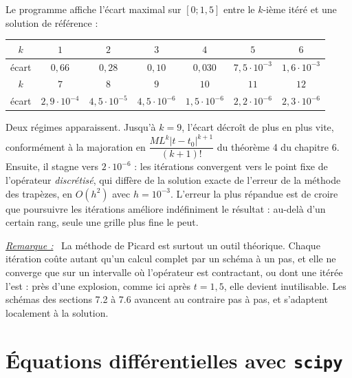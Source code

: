 \documentclass[a4paper,twoside]{report}
\newenvironment{remarque}%
 {\par\needspace{6\baselineskip}\vspace{1mm}\begin{list}{}{\leftmargin=1cm \rightmargin=0.5cm}\item[]%
  \textit{\underline{Remarque :}}~}%
 {\end{list}\vspace{1mm}}
\begin{document}
\noindent Le programme affiche l'écart maximal sur $[0 ; 1{,}5]$ entre le $k$-ième itéré et une solution de référence :

\begin{center}
\renewcommand{\arraystretch}{1.3}
\begin{tabular}{|c|c|c|c|c|c|c|}
\hline
\rowcolor{couleurD!35} $k$ & $1$ & $2$ & $3$ & $4$ & $5$ & $6$ \\ \hline
écart & $0{,}66$ & $0{,}28$ & $0{,}10$ & $0{,}030$ & $7{,}5\cdot 10^{-3}$ & $1{,}6\cdot 10^{-3}$ \\ \hline
\rowcolor{couleurD!35} $k$ & $7$ & $8$ & $9$ & $10$ & $11$ & $12$ \\ \hline
écart & $2{,}9\cdot 10^{-4}$ & $4{,}5\cdot 10^{-5}$ & $4{,}5\cdot 10^{-6}$ & $1{,}5\cdot 10^{-6}$ & $2{,}2\cdot 10^{-6}$ & $2{,}3\cdot 10^{-6}$ \\ \hline
\end{tabular}
\end{center}

\noindent Deux régimes apparaissent. Jusqu'à $k = 9$, l'écart décroît de plus en plus vite, conformément à la majoration en $\dfrac{M L^{k}|t - t_{0}|^{k + 1}}{(k + 1)!}$ du théorème 4 du chapitre 6. Ensuite, il stagne vers $2 \cdot 10^{-6}$ : les itérations convergent vers le point fixe de l'opérateur \emph{discrétisé}, qui diffère de la solution exacte de l'erreur de la méthode des trapèzes, en $O(h^{2})$ avec $h = 10^{-3}$. L'erreur la plus répandue est de croire que poursuivre les itérations améliore indéfiniment le résultat : au-delà d'un certain rang, seule une grille plus fine le peut.

\begin{remarque}
La méthode de Picard est surtout un outil théorique. Chaque itération coûte autant qu'un calcul complet par un schéma à un pas, et elle ne converge que sur un intervalle où l'opérateur est contractant, ou dont une itérée l'est : près d'une explosion, comme ici après $t = 1{,}5$, elle devient inutilisable. Les schémas des sections 7.2 à 7.6 avancent au contraire pas à pas, et s'adaptent localement à la solution.
\end{remarque}
\section[Les solveurs de scipy]{Équations différentielles avec \texttt{scipy}}
\end{document}
